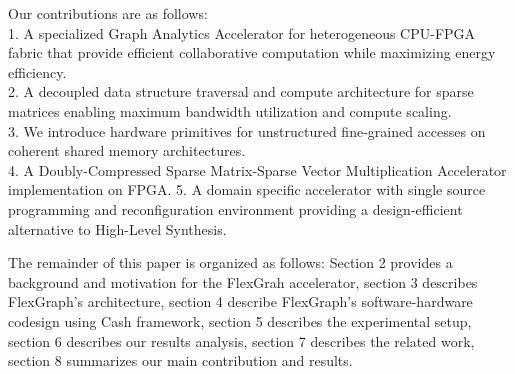 Our contributions are as follows:\\
1.	A specialized Graph Analytics Accelerator for heterogeneous CPU-FPGA fabric that provide efficient collaborative computation while maximizing energy efficiency.\\
2. 	A decoupled data structure traversal and compute architecture for sparse matrices enabling maximum bandwidth utilization and compute scaling.\\
3.	We introduce hardware primitives for unstructured fine-grained accesses on coherent shared memory architectures.\\
4. 	A Doubly-Compressed Sparse Matrix-Sparse Vector Multiplication Accelerator implementation on FPGA. 
5. 	A domain specific accelerator with single source programming and reconfiguration environment providing a design-efficient alternative to High-Level Synthesis.  

The remainder of this paper is organized as follows:
Section 2 provides a background and motivation for the FlexGrah accelerator, section 3 describes FlexGraph's architecture, section 4 describe FlexGraph's software-hardware codesign using Cash \cite{Cash} framework, section 5 describes the experimental setup, section 6 describes our results analysis, section 7 describes the related work, section 8 summarizes our main contribution and results.